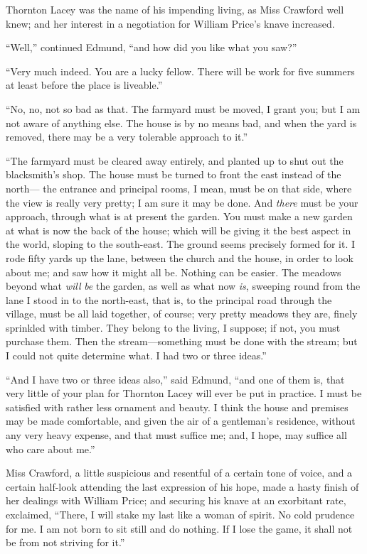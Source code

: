 \documentclass{article}
\begin{document}
Thornton Lacey was the name of his impending living,
as Miss Crawford well knew; and her interest in a negotiation
for William Price's knave increased.

``Well,'' continued Edmund, ``and how did you like what
you saw?''

``Very much indeed.  You are a lucky fellow.  There will be
work for five summers at least before the place is liveable.''

``No, no, not so bad as that.  The farmyard must be moved,
I grant you; but I am not aware of anything else.
The house is by no means bad, and when the yard is removed,
there may be a very tolerable approach to it.''

``The farmyard must be cleared away entirely, and planted
up to shut out the blacksmith's shop.  The house must
be turned to front the east instead of the north---%
the entrance and principal rooms, I mean, must be on
that side, where the view is really very pretty; I am
sure it may be done.  And \emph{there} must be your approach,
through what is at present the garden.  You must make
a new garden at what is now the back of the house;
which will be giving it the best aspect in the world,
sloping to the south-east. The ground seems precisely
formed for it.  I rode fifty yards up the lane,
between the church and the house, in order to look about me;
and saw how it might all be.  Nothing can be easier.
The meadows beyond what \emph{will} \emph{be} the garden, as well
as what now \emph{is}, sweeping round from the lane I stood
in to the north-east, that is, to the principal road
through the village, must be all laid together, of course;
very pretty meadows they are, finely sprinkled with timber.
They belong to the living, I suppose; if not, you must
purchase them.  Then the stream---something must be done
with the stream; but I could not quite determine what.
I had two or three ideas.''

``And I have two or three ideas also,'' said Edmund,
``and one of them is, that very little of your plan
for Thornton Lacey will ever be put in practice.
I must be satisfied with rather less ornament and beauty.
I think the house and premises may be made comfortable,
and given the air of a gentleman's residence, without any
very heavy expense, and that must suffice me; and, I hope,
may suffice all who care about me.''

Miss Crawford, a little suspicious and resentful of a
certain tone of voice, and a certain half-look attending
the last expression of his hope, made a hasty finish
of her dealings with William Price; and securing his knave
at an exorbitant rate, exclaimed, ``There, I will stake
my last like a woman of spirit.  No cold prudence for me.
I am not born to sit still and do nothing.  If I lose
the game, it shall not be from not striving for it.''
\end{document}
